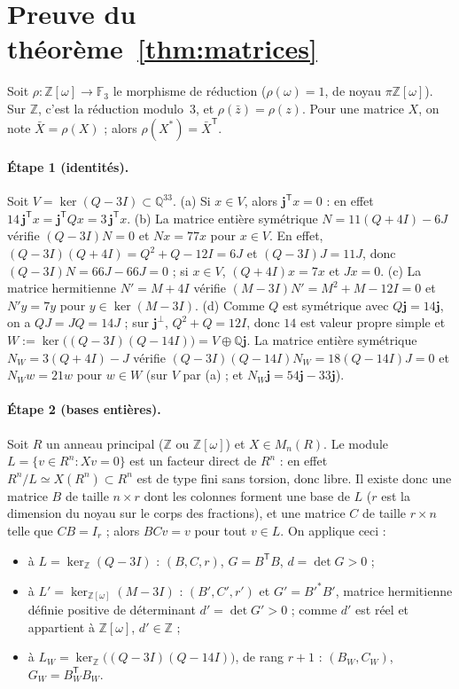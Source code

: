 \documentclass[11pt,a4paper]{article}
\theoremstyle{remark}
\newcommand{\Z}{\mathbb{Z}}
\newcommand{\Q}{\mathbb{Q}}
\newcommand{\F}{\mathbb{F}}
\newcommand{\one}{\mathbf{j}}
\begin{document}
\section{Preuve du théorème~\ref{thm:matrices}}

Soit $\rho:\Z[\omega]\to\F_3$ le morphisme de réduction ($\rho(\omega)=1$, de noyau $\pi\Z[\omega]$). Sur $\Z$, c'est la
réduction modulo~3, et $\rho(\bar z)=\rho(z)$. Pour une matrice $X$, on note $\bar X=\rho(X)$ ; alors $\rho(X^*)=\bar X^{\mathsf T}$.

\paragraph{Étape 1 (identités).}
Soit $V=\ker(Q-3I)\subset\Q^{33}$.
(a) Si $x\in V$, alors $\one^{\mathsf T}x=0$ : en effet $14\,\one^{\mathsf T}x=\one^{\mathsf T}Qx=3\,\one^{\mathsf T}x$.
(b) La matrice entière symétrique $N=11(Q+4I)-6J$ vérifie ${(Q-3I)N=0}$ et $Nx=77x$ pour $x\in V$.
En effet, $(Q-3I)(Q+4I)=Q^2+Q-12I=6J$ et $(Q-3I)J=11J$, donc $(Q-3I)N=66J-66J=0$ ; si $x\in V$, $(Q+4I)x=7x$ et $Jx=0$.
(c) La matrice hermitienne $N'=M+4I$ vérifie $(M-3I)N'=M^2+M-12I=0$ et $N'y=7y$ pour $y\in\ker(M-3I)$.
(d) Comme $Q$ est symétrique avec $Q\one=14\one$, on a $QJ=JQ=14J$ ; sur $\one^\perp$, $Q^2+Q=12I$, donc $14$ est valeur propre
simple et $W:=\ker\bigl((Q-3I)(Q-14I)\bigr)=V\oplus\Q\one$. La matrice entière symétrique $N_W=3(Q+4I)-J$ vérifie
$(Q-3I)(Q-14I)N_W=18(Q-14I)J=0$ et $N_Ww=21w$ pour $w\in W$ (sur $V$ par (a) ; et $N_W\one=54\one-33\one$).

\paragraph{Étape 2 (bases entières).}
Soit $R$ un anneau principal ($\Z$ ou $\Z[\omega]$) et $X\in M_n(R)$. Le module $L=\{v\in R^n : Xv=0\}$ est un facteur direct de
$R^n$ : en effet $R^n/L\simeq X(R^n)\subset R^n$ est de type fini sans torsion, donc libre. Il existe donc une matrice $B$ de taille
$n\times r$ dont les colonnes forment une base de $L$ ($r$ est la dimension du noyau sur le corps des fractions), et une matrice
$C$ de taille $r\times n$ telle que $CB=I_r$ ; alors $BCv=v$ pour tout $v\in L$. On applique ceci :
\begin{itemize}[nosep]
\item à $L=\ker_\Z(Q-3I)$ : $(B,C,r)$, $G=B^{\mathsf T}B$, $d=\det G>0$ ;
\item à $L'=\ker_{\Z[\omega]}(M-3I)$ : $(B',C',r')$ et $G'=B'^*B'$, matrice hermitienne définie positive de déterminant
${d'=\det G'>0}$ ;
comme $d'$ est réel et appartient à $\Z[\omega]$, $d'\in\Z$ ;
\item à $L_W=\ker_\Z\bigl((Q-3I)(Q-14I)\bigr)$, de rang $r+1$ : $(B_W,C_W)$, $G_W=B_W^{\mathsf T}B_W$.
\end{itemize}
\end{document}
